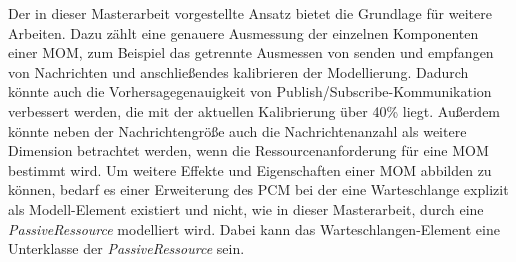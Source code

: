 Der in dieser Masterarbeit vorgestellte Ansatz bietet die Grundlage für weitere Arbeiten. Dazu zählt eine genauere Ausmessung der einzelnen Komponenten einer MOM, zum Beispiel das getrennte Ausmessen von senden und empfangen von Nachrichten und anschließendes kalibrieren der Modellierung. Dadurch könnte auch die Vorhersagegenauigkeit von Publish/Subscribe-Kommunikation verbessert werden, die mit der aktuellen Kalibrierung über 40\% liegt. Außerdem könnte neben der Nachrichtengröße auch die Nachrichtenanzahl als weitere Dimension betrachtet werden, wenn die Ressourcenanforderung für eine MOM bestimmt wird. Um weitere Effekte und Eigenschaften einer MOM abbilden zu können, bedarf es einer Erweiterung des PCM bei der eine Warteschlange explizit als Modell-Element existiert und nicht, wie in dieser Masterarbeit, durch eine \emph{PassiveRessource} modelliert wird. Dabei kann das Warteschlangen-Element eine Unterklasse der \emph{PassiveRessource} sein. 